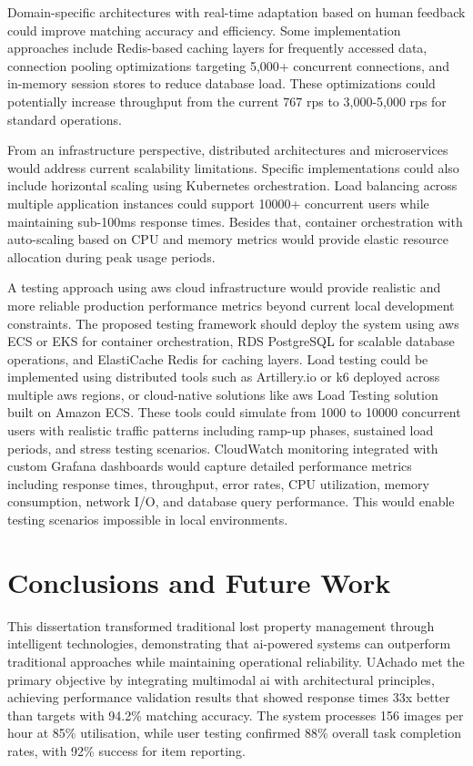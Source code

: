 Domain-specific architectures with real-time adaptation based on human feedback could improve matching accuracy and efficiency. Some implementation approaches include Redis-based caching layers for frequently accessed data, connection pooling optimizations targeting 5,000+ concurrent connections, and in-memory session stores to reduce database load. These optimizations could potentially increase throughput from the current 767 \ac{rps} to 3,000-5,000 \ac{rps} for standard operations.

From an infrastructure perspective, distributed architectures and microservices would address current scalability limitations. Specific implementations could also include horizontal scaling using Kubernetes orchestration. Load balancing across multiple application instances could support 10000+ concurrent users while maintaining sub-100ms response times. Besides that, container orchestration with auto-scaling based on CPU and memory metrics would provide elastic resource allocation during peak usage periods.

A testing approach using \ac{aws} cloud infrastructure would provide realistic and more reliable production performance metrics beyond current local development constraints. The proposed testing framework should deploy the system using \ac{aws} ECS or EKS for container orchestration, RDS PostgreSQL for scalable database operations, and ElastiCache Redis for caching layers. Load testing could be implemented using distributed tools such as Artillery.io or k6 deployed across multiple \ac{aws} regions, or cloud-native solutions like \ac{aws} Load Testing solution built on Amazon ECS. These tools could simulate from 1000 to 10000 concurrent users with realistic traffic patterns including ramp-up phases, sustained load periods, and stress testing scenarios. CloudWatch monitoring integrated with custom Grafana dashboards would capture detailed performance metrics including response times, throughput, error rates, CPU utilization, memory consumption, network I/O, and database query performance. This would enable testing scenarios impossible in local environments.


\section{Conclusions and Future Work} \label{section:conclusions_future_work}

This dissertation transformed traditional lost property management through intelligent technologies, demonstrating that \ac{ai}-powered systems can outperform traditional approaches while maintaining operational reliability. UAchado met the primary objective by integrating multimodal \ac{ai} with architectural principles, achieving performance validation results that showed response times 33x better than targets with 94.2\% matching accuracy. The system processes 156 images per hour at 85\% utilisation, while user testing confirmed 88\% overall task completion rates, with 92\% success for item reporting.

